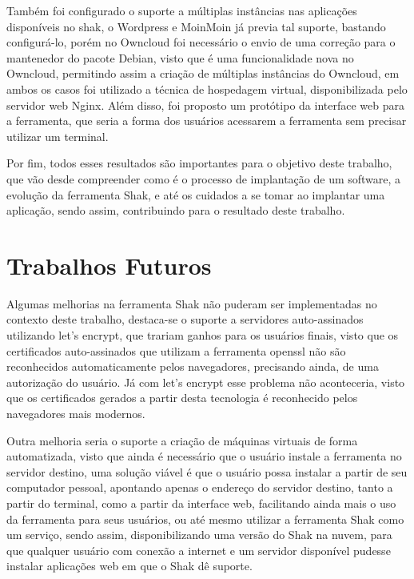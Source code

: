 Também foi configurado o suporte a múltiplas instâncias nas aplicações disponíveis
no shak, o Wordpress e MoinMoin já previa tal suporte, bastando configurá-lo, porém no Owncloud
foi necessário o envio de uma correção para o mantenedor do pacote Debian, visto que
é uma funcionalidade nova no Owncloud, permitindo assim a criação de múltiplas
instâncias do Owncloud, em ambos os casos foi utilizado a técnica de hospedagem
virtual, disponibilizada pelo servidor web Nginx. Além disso, foi proposto um protótipo
da interface web para a ferramenta, que seria a forma dos usuários acessarem a 
ferramenta sem precisar utilizar um terminal.

Por fim, todos esses resultados são importantes para o objetivo deste trabalho, que vão
desde compreender como é o processo de implantação de um software, a evolução
da ferramenta Shak, e até os cuidados
a se tomar ao implantar uma aplicação, sendo assim, contribuindo para o resultado
deste trabalho.

\section{Trabalhos Futuros}
%
Algumas melhorias na ferramenta Shak não puderam ser implementadas  no contexto
deste trabalho, destaca-se o suporte a servidores auto-assinados utilizando
let's encrypt, que trariam ganhos para os usuários finais, visto que os certificados
auto-assinados que utilizam a ferramenta openssl não são reconhecidos automaticamente 
pelos navegadores, precisando ainda, de uma autorização do usuário. Já
com let's encrypt esse problema não aconteceria, visto que os certificados
gerados a partir desta tecnologia é reconhecido pelos navegadores mais modernos.

Outra melhoria seria o suporte a criação de máquinas virtuais de forma automatizada, visto
que ainda é necessário que o usuário instale a ferramenta no servidor destino, uma
solução viável é que o usuário possa instalar a partir de seu computador pessoal,
 apontando apenas o endereço do servidor destino, tanto a partir do terminal, como
a partir da interface web, facilitando ainda mais o uso da ferramenta para seus usuários, ou
até mesmo utilizar a ferramenta Shak como um serviço, sendo assim, disponibilizando uma
versão do Shak na nuvem, para que qualquer usuário com conexão a internet e um servidor
disponível pudesse instalar aplicações web em que o Shak dê suporte.
 
